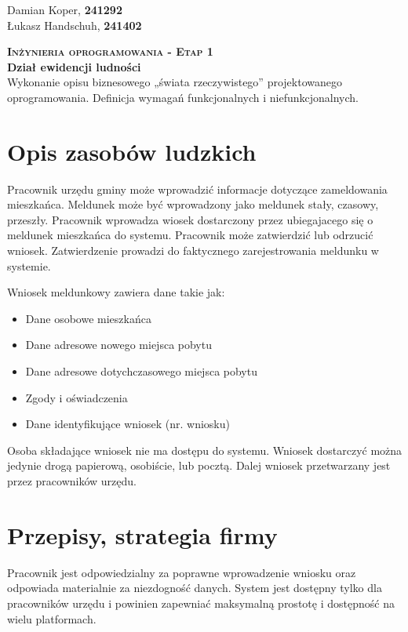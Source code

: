 \documentclass[12pt]{article}
\begin{document}
\begin{flushright}
        Damian Koper, \textbf{241292} \\
        Łukasz Handschuh, \textbf{241402}
\end{flushright}
\vspace{1cm}
{
    \centering
    {\Huge\scshape\bfseries Inżynieria oprogramowania - Etap 1 }\\
    \vspace{0.25cm}
    \Large\textbf{Dział ewidencji ludności} \\
    \vspace{0.25cm}
    \large Wykonanie opisu biznesowego „świata rzeczywistego” projektowanego oprogramowania. Definicja wymagań funkcjonalnych i niefunkcjonalnych.\\
}

\section{Opis zasobów ludzkich}

Pracownik urzędu gminy może wprowadzić informacje dotyczące zameldowania mieszkańca. Meldunek może być wprowadzony jako meldunek stały, czasowy, przeszły. Pracownik wprowadza wiosek dostarczony przez ubiegajacego się o meldunek mieszkańca do systemu. Pracownik może zatwierdzić lub odrzucić wniosek. Zatwierdzenie prowadzi do faktycznego zarejestrowania meldunku w systemie.

Wniosek meldunkowy zawiera dane takie jak:
\begin{itemize}
    \item Dane osobowe mieszkańca
    \item Dane adresowe nowego miejsca pobytu
    \item Dane adresowe dotychczasowego miejsca pobytu
    \item Zgody i oświadczenia
    \item Dane identyfikujące wniosek (nr. wniosku)
\end{itemize}

Osoba składające wniosek nie ma dostępu do systemu. Wniosek dostarczyć można jedynie drogą papierową, osobiście, lub pocztą. Dalej wniosek przetwarzany jest przez pracowników urzędu.

\section{Przepisy, strategia firmy}

Pracownik jest odpowiedzialny za poprawne wprowadzenie wniosku oraz odpowiada materialnie za niezdogność danych. System jest dostępny tylko dla pracowników urzędu i powinien zapewniać maksymalną prostotę i dostępność na wielu platformach.
\end{document}
